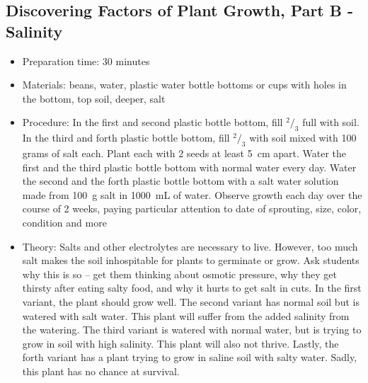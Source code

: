 \subsection{Discovering Factors of Plant Growth, Part B - Salinity}
\begin{itemize}
\item{Preparation time: 30 minutes}
\item{Materials: beans, water, plastic water bottle bottoms or cups with holes in the bottom, top soil, deeper, salt}
\item{Procedure: In the first and second plastic bottle bottom, fill $^2/_3$ full with soil. In the third and forth plastic bottle bottom, fill $^2/_3$ with soil mixed with 100 grams of salt each. Plant each with 2 seeds at least 5~cm apart. Water the first and the third plastic bottle bottom with normal water every day. Water the second and the forth plastic bottle bottom with a salt water solution made from 100~g salt in 1000~mL of water. Observe growth each day over the course of 2 weeks, paying particular attention to date of sprouting, size, color, condition and more}
\item{Theory: Salts and other electrolytes are necessary to live. However, too much salt makes the soil inhospitable for plants to germinate or grow. Ask students why this is so – get them thinking about osmotic pressure, why they get thirsty after eating salty food, and why it hurts to get salt in cuts. In the first variant, the plant should grow well. The second variant has normal soil but is watered with salt water. This plant will suffer from the added salinity from the watering. The third variant is watered with normal water, but is trying to grow in soil with high salinity. This plant will also not thrive. Lastly, the forth variant has a plant trying to grow in saline soil with salty water. Sadly, this plant has no chance at survival.}
\end{itemize}

